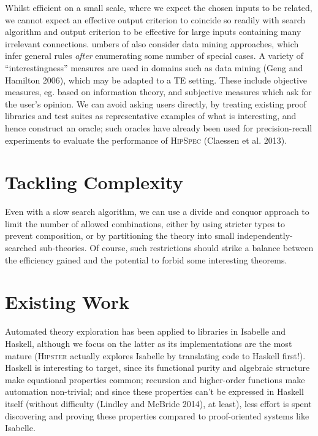\documentclass[]{article}
\begin{document}
Whilst efficient on a small scale, where we expect the chosen inputs to
be related, we cannot expect an effective output criterion to coincide
so readily with search algorithm and output criterion to be effective
for large inputs containing many irrelevant connections. umbers of also
consider data mining approaches, which infer general rules \emph{after}
enumerating some number of special cases. A variety of
``interestingness'' measures are used in domains such as data mining
(Geng and Hamilton 2006), which may be adapted to a TE setting. These
include objective measures, eg. based on information theory, and
subjective measures which ask for the user's opinion. We can avoid
asking users directly, by treating existing proof libraries and test
suites as representative examples of what is interesting, and hence
construct an oracle; such oracles have already been used for
precision-recall experiments to evaluate the performance of
\textsc{HipSpec} (Claessen et al. 2013).

\section{Tackling Complexity}\label{tackling-complexity}

Even with a slow search algorithm, we can use a divide and conquor
approach to limit the number of allowed combinations, either by using
stricter types to prevent composition, or by partitioning the theory
into small independently-searched sub-theories. Of course, such
restrictions should strike a balance between the efficiency gained and
the potential to forbid some interesting theorems.

\section{Existing Work}\label{existing-work}

Automated theory exploration has been applied to libraries in Isabelle
and Haskell, although we focus on the latter as its implementations are
the most mature (\textsc{Hipster} actually explores Isabelle by
translating code to Haskell first!). Haskell is interesting to target,
since its functional purity and algebraic structure make equational
properties common; recursion and higher-order functions make automation
non-trivial; and since these properties can't be expressed in Haskell
itself (without difficulty (Lindley and McBride 2014), at least), less
effort is spent discovering and proving these properties compared to
proof-oriented systems like Isabelle.
\end{document}
